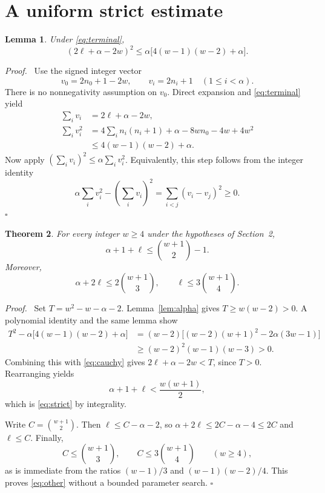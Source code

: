 \documentclass[11pt,a4paper]{article}
\newtheorem{theorem}{Theorem}[section]
\newtheorem{lemma}[theorem]{Lemma}
\newenvironment{proof}[1][Proof]{\par\noindent\textit{#1.}\ \ignorespaces}{\unskip\nobreak\hfill\ensuremath{\square}\par}
\begin{document}
\section{A uniform strict estimate}
\begin{lemma}\label{lem:cauchy}
Under \eqref{eq:terminal},
\begin{equation}\label{eq:cauchy}
 (2\ell+\alpha-2w)^2\le
 \alpha\bigl[4(w-1)(w-2)+\alpha\bigr].
\end{equation}
\end{lemma}
\begin{proof}
Use the signed integer vector
\[
 v_0=2n_0+1-2w,\qquad v_i=2n_i+1\quad(1\le i<\alpha).
\]
There is no nonnegativity assumption on $v_0$. Direct expansion and \eqref{eq:terminal} yield
\begin{align*}
 \sum_i v_i&=2\ell+\alpha-2w,\\
 \sum_i v_i^2
 &=4\sum_i n_i(n_i+1)+\alpha-8wn_0-4w+4w^2\\
 &\le4(w-1)(w-2)+\alpha.
\end{align*}
Now apply $(\sum_i v_i)^2\le\alpha\sum_i v_i^2$. Equivalently, this step follows from the integer identity
\[
 \alpha\sum_i v_i^2-(\sum_i v_i)^2=\sum_{i<j}(v_i-v_j)^2\ge0.
\]
\end{proof}

\begin{theorem}\label{thm:strict}
For every integer $w\ge4$ under the hypotheses of Section~2,
\begin{equation}\label{eq:strict}
 \alpha+1+\ell\le\binom{w+1}{2}-1.
\end{equation}
Moreover,
\begin{equation}\label{eq:other}
 \alpha+2\ell\le2\binom{w+1}{3},\qquad
 \ell\le3\binom{w+1}{4}.
\end{equation}
\end{theorem}
\begin{proof}
Set $T=w^2-w-\alpha-2$. Lemma~\ref{lem:alpha} gives $T\ge w(w-2)>0$. A polynomial identity and the same lemma show
\begin{align*}
 T^2-\alpha\bigl[4(w-1)(w-2)+\alpha\bigr]
 &=(w-2)\bigl[(w-2)(w+1)^2-2\alpha(3w-1)\bigr]\\
 &\ge(w-2)^2(w-1)(w-3)>0.
\end{align*}
Combining this with \eqref{eq:cauchy} gives $2\ell+\alpha-2w<T$, since $T>0$. Rearranging yields
\[
 \alpha+1+\ell<\frac{w(w+1)}2,
\]
which is \eqref{eq:strict} by integrality.

Write $C=\binom{w+1}{2}$. Then $\ell\le C-\alpha-2$, so $\alpha+2\ell\le2C-\alpha-4\le2C$ and $\ell\le C$. Finally,
\[
 C\le\binom{w+1}{3},\qquad C\le3\binom{w+1}{4}\qquad(w\ge4),
\]
as is immediate from the ratios $(w-1)/3$ and $(w-1)(w-2)/4$. This proves \eqref{eq:other} without a bounded parameter search.
\end{proof}
\end{document}
